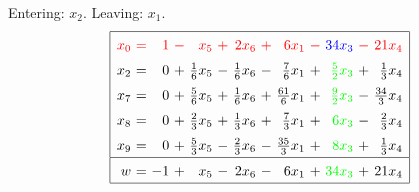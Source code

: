 \documentclass[11pt]{article}
\begin{document}
Entering: $x_{2}$. Leaving: $x_{1}$. 
\begin{equation*}
\renewcommand{\arraystretch}{1.5} %
\begin{array}{|rcrcrcrcrcrcr|}
\hline
\color{red}x_{0} \mspace{-6mu}&\color{red}\mspace{-6mu} = \mspace{-6mu}&\color{red}\mspace{-6mu} 1 \mspace{-6mu}&\color{red}\mspace{-6mu} - \mspace{-6mu}&\color{red}\mspace{-6mu} x_{5} \mspace{-6mu}&\color{red}\mspace{-6mu} + \mspace{-6mu}&\color{red}\mspace{-6mu} 2 x_{6} \mspace{-6mu}&\color{red}\mspace{-6mu} + \mspace{-6mu}&\color{red}\mspace{-6mu} 6 x_{1} \mspace{-6mu}&\color{red}\mspace{-6mu} - \mspace{-6mu}&\color{blue}\mspace{-6mu} 34 x_{3} \mspace{-6mu}&\color{red}\mspace{-6mu} - \mspace{-6mu}&\color{red}\mspace{-6mu} 21 x_{4}\\
x_{2} \mspace{-6mu}&\mspace{-6mu} = \mspace{-6mu}&\mspace{-6mu} 0 \mspace{-6mu}&\mspace{-6mu} + \mspace{-6mu}&\mspace{-6mu} \frac{1}{6} x_{5} \mspace{-6mu}&\mspace{-6mu} - \mspace{-6mu}&\mspace{-6mu} \frac{1}{6} x_{6} \mspace{-6mu}&\mspace{-6mu} - \mspace{-6mu}&\mspace{-6mu} \frac{7}{6} x_{1} \mspace{-6mu}&\mspace{-6mu} + \mspace{-6mu}&\color{green}\mspace{-6mu} \frac{5}{2} x_{3} \mspace{-6mu}&\mspace{-6mu} + \mspace{-6mu}&\mspace{-6mu} \frac{1}{3} x_{4}\\
x_{7} \mspace{-6mu}&\mspace{-6mu} = \mspace{-6mu}&\mspace{-6mu} 0 \mspace{-6mu}&\mspace{-6mu} + \mspace{-6mu}&\mspace{-6mu} \frac{5}{6} x_{5} \mspace{-6mu}&\mspace{-6mu} + \mspace{-6mu}&\mspace{-6mu} \frac{1}{6} x_{6} \mspace{-6mu}&\mspace{-6mu} + \mspace{-6mu}&\mspace{-6mu} \frac{61}{6} x_{1} \mspace{-6mu}&\mspace{-6mu} + \mspace{-6mu}&\color{green}\mspace{-6mu} \frac{9}{2} x_{3} \mspace{-6mu}&\mspace{-6mu} - \mspace{-6mu}&\mspace{-6mu} \frac{34}{3} x_{4}\\
x_{8} \mspace{-6mu}&\mspace{-6mu} = \mspace{-6mu}&\mspace{-6mu} 0 \mspace{-6mu}&\mspace{-6mu} + \mspace{-6mu}&\mspace{-6mu} \frac{2}{3} x_{5} \mspace{-6mu}&\mspace{-6mu} + \mspace{-6mu}&\mspace{-6mu} \frac{1}{3} x_{6} \mspace{-6mu}&\mspace{-6mu} + \mspace{-6mu}&\mspace{-6mu} \frac{7}{3} x_{1} \mspace{-6mu}&\mspace{-6mu} + \mspace{-6mu}&\color{green}\mspace{-6mu} 6 x_{3} \mspace{-6mu}&\mspace{-6mu} - \mspace{-6mu}&\mspace{-6mu} \frac{2}{3} x_{4}\\
x_{9} \mspace{-6mu}&\mspace{-6mu} = \mspace{-6mu}&\mspace{-6mu} 0 \mspace{-6mu}&\mspace{-6mu} + \mspace{-6mu}&\mspace{-6mu} \frac{5}{3} x_{5} \mspace{-6mu}&\mspace{-6mu} - \mspace{-6mu}&\mspace{-6mu} \frac{2}{3} x_{6} \mspace{-6mu}&\mspace{-6mu} - \mspace{-6mu}&\mspace{-6mu} \frac{35}{3} x_{1} \mspace{-6mu}&\mspace{-6mu} + \mspace{-6mu}&\color{green}\mspace{-6mu} 8 x_{3} \mspace{-6mu}&\mspace{-6mu} + \mspace{-6mu}&\mspace{-6mu} \frac{1}{3} x_{4}\\
\hline
w \mspace{-6mu}&\mspace{-6mu} = \mspace{-6mu}&\mspace{-6mu} -1 \mspace{-6mu}&\mspace{-6mu} + \mspace{-6mu}&\mspace{-6mu} x_{5} \mspace{-6mu}&\mspace{-6mu} - \mspace{-6mu}&\mspace{-6mu} 2 x_{6} \mspace{-6mu}&\mspace{-6mu} - \mspace{-6mu}&\mspace{-6mu} 6 x_{1} \mspace{-6mu}&\mspace{-6mu} + \mspace{-6mu}&\color{green}\mspace{-6mu} 34 x_{3} \mspace{-6mu}&\mspace{-6mu} + \mspace{-6mu}&\mspace{-6mu} 21 x_{4}\\
\hline
\end{array}
\end{equation*}
\end{document}
